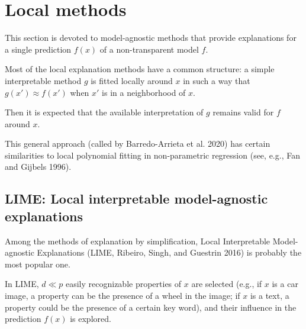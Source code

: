 
\section{Local methods}

This section is devoted to model-agnostic methods that provide
explanations for a single prediction $f(x)$ of a non-transparent model
$f$.

Most of the local explanation methods have a common structure: a
simple interpretable method $g$ is fitted locally around $x$ in such a
way that $g(x') \approx f (x')$ when $x'$ is in a neighborhood of $x$.

Then it is expected that the available interpretation of $g$ remains
valid for $f$ around $x$.

This general approach (called  by
Barredo-Arrieta et al. 2020) has certain similarities to local
polynomial fitting in non-parametric regression (see, e.g., Fan and
Gijbels 1996).

\subsection{LIME: Local interpretable model-agnostic explanations}

Among the methods of explanation by simplification, Local
Interpretable Model-agnostic Explanations (LIME, Ribeiro, Singh,
and Guestrin 2016) is probably the most popular one.

In LIME, $d \ll p$ easily recognizable properties of $x$ are selected
(e.g., if $x$ is a car image, a property can be the presence of a wheel
in the image; if $x$ is a text, a property could be the presence of a
certain key word), and their influence in the prediction $f (x)$ is
explored.

